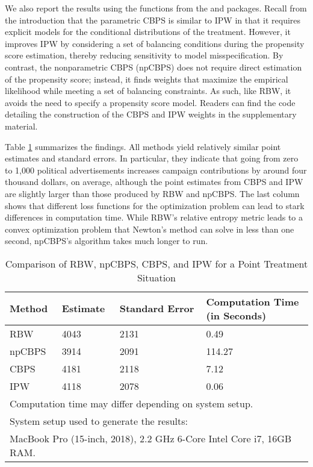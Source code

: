 We also report the results using the functions from the 
and  packages. Recall from the introduction that the
parametric CBPS is similar to IPW in that it requires explicit models
for the conditional distributions of the treatment. However, it improves
IPW by considering a set of balancing conditions during the propensity
score estimation, thereby reducing sensitivity to model
misspecification. By contrast, the nonparametric CBPS (npCBPS) does not
require direct estimation of the propensity score; instead, it finds
weights that maximize the empirical likelihood while meeting a set of
balancing constraints. As such, like RBW, it avoids the need to specify
a propensity score model. Readers can find the code detailing the
construction of the CBPS and IPW weights in the supplementary material.

Table \ref{tab:point-treatment-comparison} summarizes the findings. All
methods yield relatively similar point estimates and standard errors. In
particular, they indicate that going from zero to 1,000 political
advertisements increases campaign contributions by around four thousand
dollars, on average, although the point estimates from CBPS and IPW are
slightly larger than those produced by RBW and npCBPS. The last column
shows that different loss functions for the optimization problem can
lead to stark differences in computation time. While RBW's relative
entropy metric leads to a convex optimization problem that Newton's
method can solve in less than one second, npCBPS's algorithm takes much
longer to run.

\begin{Schunk}
\begin{table}[ht]

\caption{\label{tab:point-treatment-comparison}Comparison of RBW, npCBPS, CBPS, and IPW for a Point Treatment Situation}
\centering
\begin{tabular}[t]{llll}
\toprule
Method & Estimate & Standard Error & \makecell[l]{Computation Time\\(in Seconds)}\\
\midrule
RBW & 4043 & 2131 & 0.49\\
npCBPS & 3914 & 2091 & 114.27\\
CBPS & 4181 & 2118 & 7.12\\
IPW & 4118 & 2078 & 0.06\\
\bottomrule
\multicolumn{4}{l}{\textsuperscript{} Computation time may differ depending on system setup.}\\
\multicolumn{4}{l}{\textsuperscript{} System setup used to generate the results:}\\
\multicolumn{4}{l}{\textsuperscript{} MacBook Pro (15-inch, 2018), 2.2 GHz 6-Core Intel Core i7, 16GB RAM.}\\
\end{tabular}
\end{table}

\end{Schunk}

